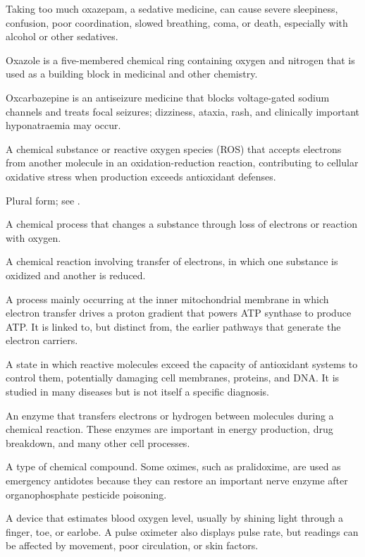  Taking too much oxazepam, a sedative medicine, can cause severe sleepiness, confusion, poor coordination, slowed breathing, coma, or death, especially with alcohol or other sedatives.

 Oxazole is a five-membered chemical ring containing oxygen and nitrogen that is used as a building block in medicinal and other chemistry.

 Oxcarbazepine is an antiseizure medicine that blocks voltage-gated sodium channels and treats focal seizures; dizziness, ataxia, rash, and clinically important hyponatraemia may occur.

 A chemical substance or reactive oxygen species (ROS) that accepts electrons from another molecule in an oxidation-reduction reaction, contributing to cellular oxidative stress when production exceeds antioxidant defenses.

 Plural form; see .

 A chemical process that changes a substance through loss of electrons or reaction with oxygen.

 A chemical reaction involving transfer of electrons, in which one substance is oxidized and another is reduced.

 A process mainly occurring at the inner mitochondrial membrane in which electron transfer drives a proton gradient that powers ATP synthase to produce ATP. It is linked to, but distinct from, the earlier pathways that generate the electron carriers.

 A state in which reactive molecules exceed the capacity of antioxidant systems to control them, potentially damaging cell membranes, proteins, and DNA. It is studied in many diseases but is not itself a specific diagnosis.

 An enzyme that transfers electrons or hydrogen between molecules during a chemical reaction. These enzymes are important in energy production, drug breakdown, and many other cell processes.

 A type of chemical compound. Some oximes, such as pralidoxime, are used as emergency antidotes because they can restore an important nerve enzyme after organophosphate pesticide poisoning.

 A device that estimates blood oxygen level, usually by shining light through a finger, toe, or earlobe. A pulse oximeter also displays pulse rate, but readings can be affected by movement, poor circulation, or skin factors.

